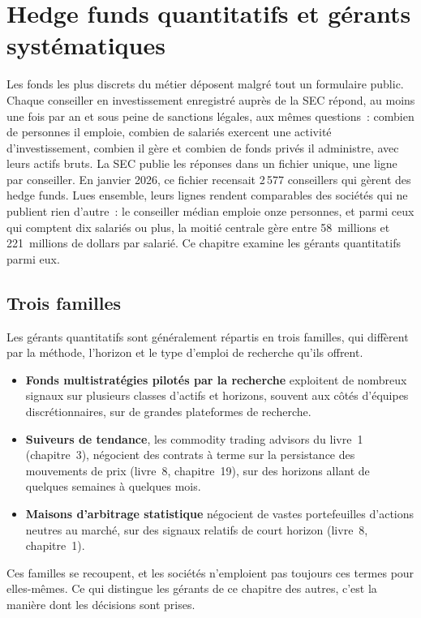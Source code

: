 \chapter{Hedge funds quantitatifs et gérants systématiques}\label{ch:in:quantitative-hedge-funds-and-systematic-managers}

Les fonds les plus discrets du métier déposent malgré tout un formulaire public. Chaque conseiller en investissement enregistré auprès de la SEC
répond, au moins une fois par an et sous peine de sanctions légales, aux mêmes questions~: combien de personnes il emploie, combien de salariés
exercent une activité d'investissement, combien il gère et combien de fonds privés il administre, avec leurs actifs bruts. La SEC
publie les réponses dans un fichier unique, une ligne par conseiller. En janvier 2026, ce fichier recensait 2\,577 conseillers qui gèrent des
hedge funds. Lues ensemble, leurs lignes rendent comparables des sociétés qui ne publient rien d'autre~: le conseiller médian emploie onze
personnes, et parmi ceux qui comptent dix salariés ou plus, la moitié centrale gère entre 58~millions et 221~millions de dollars par
salarié. Ce chapitre examine les gérants quantitatifs parmi eux.

\section{Trois familles}

Les gérants quantitatifs sont généralement répartis en trois familles, qui diffèrent par la méthode, l'horizon et le
type d'emploi de recherche qu'ils offrent.
\begin{itemize}
\item \textbf{Fonds multistratégies pilotés par la recherche} exploitent de nombreux signaux sur plusieurs classes d'actifs et horizons, souvent
aux côtés d'équipes discrétionnaires, sur de grandes plateformes de recherche.
\item \textbf{Suiveurs de tendance}, les commodity trading advisors du livre~1 (chapitre~3), négocient des contrats à terme sur la persistance
des mouvements de prix (livre~8, chapitre~19), sur des horizons allant de quelques semaines à quelques mois.
\item \textbf{Maisons d'arbitrage statistique} négocient de vastes portefeuilles d'actions neutres au marché, sur des signaux relatifs de court
horizon (livre~8, chapitre~1).
\end{itemize}
Ces familles se recoupent, et les sociétés n'emploient pas toujours ces termes pour elles-mêmes. Ce qui distingue les gérants de ce
chapitre des autres, c'est la manière dont les décisions sont prises.

